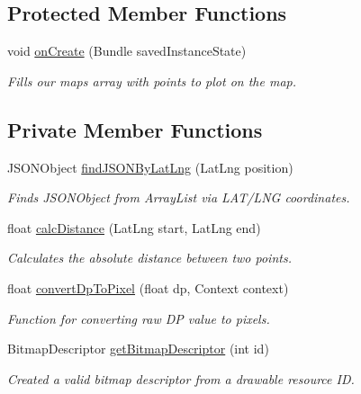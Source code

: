 \subsection*{Protected Member Functions}
\begin{DoxyCompactItemize}
\item 
void \hyperlink{class_android_app_1_1_maps_activity_a179ec8e25e279c4fa33aa74a90019489}{on\+Create} (Bundle saved\+Instance\+State)
\begin{DoxyCompactList}\small\item\em Fills our maps array with points to plot on the map. \end{DoxyCompactList}\end{DoxyCompactItemize}
\subsection*{Private Member Functions}
\begin{DoxyCompactItemize}
\item 
J\+S\+O\+N\+Object \hyperlink{class_android_app_1_1_maps_activity_a18364d9334710362b1e6c39502353927}{find\+J\+S\+O\+N\+By\+Lat\+Lng} (Lat\+Lng position)
\begin{DoxyCompactList}\small\item\em Finds J\+S\+O\+N\+Object from Array\+List via L\+A\+T/\+L\+NG coordinates. \end{DoxyCompactList}\item 
float \hyperlink{class_android_app_1_1_maps_activity_aea9b9fe75f1d70e3c902c8348823efd0}{calc\+Distance} (Lat\+Lng start, Lat\+Lng end)
\begin{DoxyCompactList}\small\item\em Calculates the absolute distance between two points. \end{DoxyCompactList}\item 
float \hyperlink{class_android_app_1_1_maps_activity_a2f93b1f03094b96020cee7e06ce5fc85}{convert\+Dp\+To\+Pixel} (float dp, Context context)
\begin{DoxyCompactList}\small\item\em Function for converting raw DP value to pixels. \end{DoxyCompactList}\item 
Bitmap\+Descriptor \hyperlink{class_android_app_1_1_maps_activity_a77f66c756f18d56bd41f0ee1c889fb62}{get\+Bitmap\+Descriptor} (int id)
\begin{DoxyCompactList}\small\item\em Created a valid bitmap descriptor from a drawable resource ID. \end{DoxyCompactList}\end{DoxyCompactItemize}
